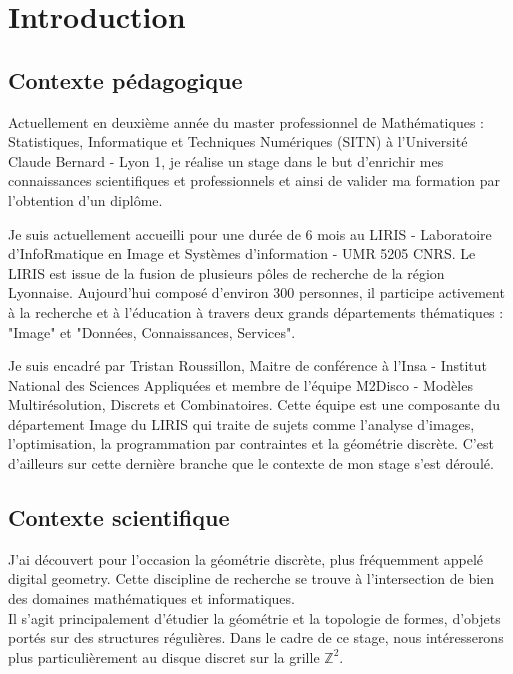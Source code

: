 \section{Introduction}

\subsection{Contexte pédagogique}

Actuellement en deuxième année du master professionnel de Mathématiques : Statistiques, Informatique et Techniques Numériques (SITN) à l’Université Claude Bernard - Lyon 1, je réalise un stage dans le but d'enrichir mes connaissances scientifiques et professionnels et ainsi de valider ma formation par l'obtention d'un diplôme.\newline

Je suis actuellement accueilli pour une durée de 6 mois au LIRIS - Laboratoire d'InfoRmatique en Image et Systèmes d'information - UMR 5205 CNRS. Le LIRIS est issue de la fusion de plusieurs pôles de recherche de la région Lyonnaise. Aujourd'hui composé d'environ 300 personnes, il participe activement à la recherche et à l'éducation à travers deux grands départements thématiques : "Image" et "Données, Connaissances, Services".\newline

Je suis encadré par Tristan Roussillon, Maitre de conférence à l'Insa - Institut National des Sciences Appliquées et membre de l'équipe M2Disco - Modèles Multirésolution, Discrets et Combinatoires. Cette équipe est une composante du département Image du LIRIS qui traite de sujets comme l'analyse d'images, l'optimisation, la programmation par contraintes et la géométrie discrète. C'est d'ailleurs sur cette dernière branche que le contexte de mon stage s'est déroulé.



\subsection{Contexte scientifique}

J'ai découvert pour l’occasion la géométrie discrète, plus fréquemment appelé digital geometry. Cette discipline de recherche se trouve à l'intersection de bien des domaines mathématiques et informatiques.\\

   
Il s'agit principalement d'étudier la géométrie et la topologie de formes, d'objets portés sur des structures régulières. Dans le cadre de ce stage, nous intéresserons plus particulièrement au disque discret sur la grille $\mathbb{Z}^{2}$. 
